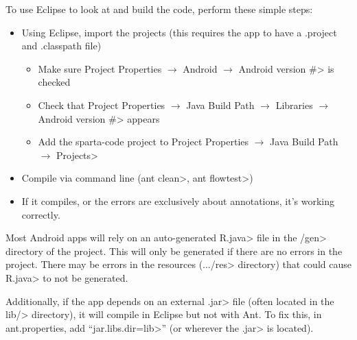 To use Eclipse to look at and build the code, perform these simple
steps:
\begin{itemize}
\item
Using Eclipse, import the projects (this requires the app to have a
.project and .classpath file)
  \begin{itemize}
    \item
    Make sure
    \<Project Properties $\rightarrow$ Android $\rightarrow$ Android
    version \#> is checked

    \item
    Check that
    \<Project Properties $\rightarrow$ Java Build Path $\rightarrow$
    Libraries $\rightarrow$ Android version \#> appears

    \item
    Add the sparta-code project to
    \<Project Properties $\rightarrow$ Java Build Path $\rightarrow$ Projects>
    
  \end{itemize}

\item Compile via command line (\<ant clean>, \<ant flowtest>)

\item If it compiles, or the errors are exclusively about annotations,
  it's working correctly.
\end{itemize}

Most Android apps will rely on an auto-generated \<R.java> file
in the \</gen> directory of the project. This will only be generated
if there are no errors in the project. There may be errors in the
resources (\<.../res> directory) that could cause \<R.java> to not be
generated.

Additionally, if the app depends on an external \<.jar> file (often
located in the \<lib/> directory), it will compile in Eclipse but not
with Ant. To fix this, in ant.properties, add ``\<jar.libs.dir=lib>''
(or wherever the \<.jar> is located).



